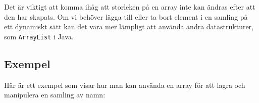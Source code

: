 \hypertarget{cb4}{}
\begin{Shaded}
\begin{Highlighting}[]
\OperatorTok{(}\OperatorTok{);}  
\end{Highlighting}
\end{Shaded}

Det är viktigt att komma ihåg att storleken på en array inte kan ändras
efter att den har skapats. Om vi behöver lägga till eller ta bort
element i en samling på ett dynamiskt sätt kan det vara mer lämpligt att
använda andra datastrukturer, som \texttt{ArrayList} i Java.

\hypertarget{exempel}{%
\subsection{Exempel}\label{exempel}}

Här är ett exempel som visar hur man kan använda en array för att lagra
och manipulera en samling av namn:

\hypertarget{cb5}{}
\begin{Shaded}
\begin{Highlighting}[]
\OperatorTok{[]}\OperatorTok{=}  \OperatorTok{[}\OperatorTok{];}
\OperatorTok{[}\OperatorTok{]} \OperatorTok{=} \OperatorTok{;}
\OperatorTok{[}\OperatorTok{]} \OperatorTok{=} \OperatorTok{;}
\OperatorTok{[}\OperatorTok{]} \OperatorTok{=} \OperatorTok{;}

\OperatorTok{(}\OperatorTok{[}\OperatorTok{]);}  

\OperatorTok{[}\OperatorTok{]} \OperatorTok{=} \OperatorTok{;}
\OperatorTok{(}\OperatorTok{[}\OperatorTok{]);}  
\end{Highlighting}
\end{Shaded}

